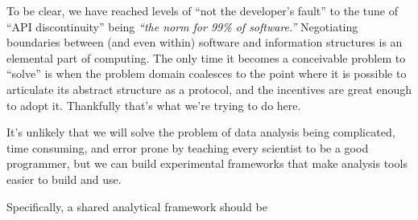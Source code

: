 \documentclass[notoc]{tufte-book}
\begin{document}
To be clear, we have reached levels of ``not the developer's fault'' to
the tune of ``API discontinuity'' being \emph{``the norm for 99\% of
software.''} Negotiating boundaries between (and even within) software
and information structures is an elemental part of computing. The only
time it becomes a conceivable problem to ``solve'' is when the problem
domain coalesces to the point where it is possible to articulate its
abstract structure as a protocol, and the incentives are great enough to
adopt it. Thankfully that's what we're trying to do here.

It's unlikely that we will solve the problem of data analysis being
complicated, time consuming, and error prone by teaching every scientist
to be a good programmer, but we can build experimental frameworks that
make analysis tools easier to build and use.

Specifically, a shared analytical framework should be
\end{document}
